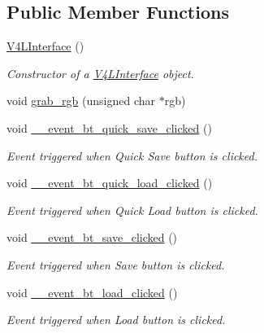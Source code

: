 \subsection*{Public Member Functions}
\begin{DoxyCompactItemize}
\item 
\hyperlink{class_v_s_s_s___g_u_i_1_1_v4_l_interface_a8fafd828eacc6d5480649fa9fddc7ee4}{V4\+L\+Interface} ()
\begin{DoxyCompactList}\small\item\em Constructor of a \hyperlink{class_v_s_s_s___g_u_i_1_1_v4_l_interface}{V4\+L\+Interface} object. \end{DoxyCompactList}\item 
void \hyperlink{class_v_s_s_s___g_u_i_1_1_v4_l_interface_a4253d7fbc31e63ce398d47317baaf3a5}{grab\+\_\+rgb} (unsigned char $\ast$rgb)
\item 
void \hyperlink{class_v_s_s_s___g_u_i_1_1_v4_l_interface_a018c35ae221964d08f1abb40ba01abcf}{\+\_\+\+\_\+event\+\_\+bt\+\_\+quick\+\_\+save\+\_\+clicked} ()
\begin{DoxyCompactList}\small\item\em Event triggered when \textquotesingle{}Quick Save\textquotesingle{} button is clicked. \end{DoxyCompactList}\item 
void \hyperlink{class_v_s_s_s___g_u_i_1_1_v4_l_interface_a3010084dff2d7f93eed40efaab8ee61b}{\+\_\+\+\_\+event\+\_\+bt\+\_\+quick\+\_\+load\+\_\+clicked} ()
\begin{DoxyCompactList}\small\item\em Event triggered when \textquotesingle{}Quick Load\textquotesingle{} button is clicked. \end{DoxyCompactList}\item 
void \hyperlink{class_v_s_s_s___g_u_i_1_1_v4_l_interface_a86cbf672edfd408bcac975be8dbacffd}{\+\_\+\+\_\+event\+\_\+bt\+\_\+save\+\_\+clicked} ()
\begin{DoxyCompactList}\small\item\em Event triggered when \textquotesingle{}Save\textquotesingle{} button is clicked. \end{DoxyCompactList}\item 
void \hyperlink{class_v_s_s_s___g_u_i_1_1_v4_l_interface_a62894fc8a49716b44d3a3c6a445fe880}{\+\_\+\+\_\+event\+\_\+bt\+\_\+load\+\_\+clicked} ()
\begin{DoxyCompactList}\small\item\em Event triggered when \textquotesingle{}Load\textquotesingle{} button is clicked. \end{DoxyCompactList}\item 

\end{DoxyCompactItemize}

